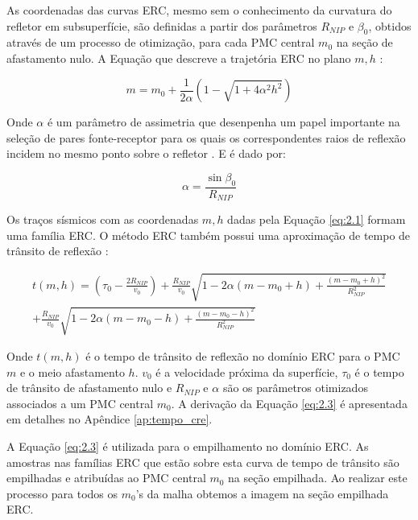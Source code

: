 As coordenadas das curvas ERC, mesmo sem o conhecimento da curvatura do refletor em subsuperfície, são definidas
a partir dos parâmetros $R_{NIP}$ e $\beta_0$, obtidos através de um processo de otimização, 
para cada PMC central $m_0$ na seção de afastamento nulo. A Equação que descreve a trajetória ERC no plano $m, h$ \cite{cre}:

\begin{equation}
 \label{eq:2.1}
 m= m_0 + \frac{1}{2\alpha} (1-\sqrt{1+4\alpha^2h^2})
\end{equation}

Onde $\alpha$ é um parâmetro de assimetria que desenpenha um papel importante na seleção de pares fonte-receptor para os quais
os correspondentes raios de reflexão incidem no mesmo ponto sobre o refletor \cite{tygel}. E é dado por:

\begin{equation}
\label{eq:2.2}
 \alpha=\frac{\sin{\beta_0}}{R_{NIP}}
\end{equation}

Os traços sísmicos com as coordenadas $m, h$ dadas pela Equação \ref{eq:2.1} formam uma família ERC.
O método ERC também possui uma aproximação de tempo de trânsito de
reflexão \cite{cre}:

\begin{multline}
\label{eq:2.3}
t(m,h)= \left( \tau_0-\frac{2R_{NIP}}{v_0} \right) 
+\frac{R_{NIP}}{v_0}\sqrt{1-2\alpha(m-m_0+h)+\frac{(m-m_0+h)^2}{R_{NIP}^2}} \\
+\frac{R_{NIP}}{v_0}\sqrt{1-2\alpha(m-m_0-h)+\frac{(m-m_0-h)^2}{R_{NIP}^2}}
\end{multline}

Onde $t(m,h)$ é o tempo de trânsito de reflexão no domínio ERC para o PMC $m$ e o meio afastamento $h$.
$v_0$ é a velocidade próxima da superfície, $\tau_0$ é o tempo de trânsito de afastamento nulo e 
$R_{NIP}$ e $\alpha$ são os parâmetros otimizados associados a um PMC central $m_0$. A derivação da
Equação \ref{eq:2.3} é apresentada em detalhes no Apêndice \ref{ap:tempo_cre}.

A Equação \ref{eq:2.3} é utilizada para o empilhamento no domínio ERC. As amostras nas famílias ERC 
que estão sobre esta curva de tempo de trânsito são empilhadas e atribuídas ao PMC central $m_0$ na seção empilhada.
Ao realizar este processo para todos os $m_0$'s da malha obtemos a imagem na seção empilhada ERC.

